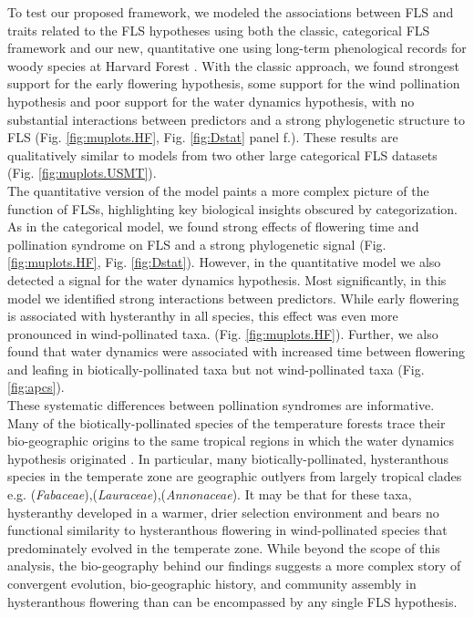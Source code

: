 \documentclass{article}
\begin{document}
To test our proposed framework, we modeled the associations between FLS and traits related to the FLS hypotheses using both the classic, categorical FLS framework and our new, quantitative one using long-term phenological records for woody species at Harvard Forest \citep{OKeefe2015}. With the classic approach, we found strongest support for the early flowering hypothesis, some support for the wind pollination hypothesis and poor support for the water dynamics hypothesis, with no substantial interactions between predictors and a strong phylogenetic structure to FLS (Fig. \ref{fig:muplots.HF}, Fig.  \ref{fig:Dstat} panel f.). These results are qualitatively similar to models from two other large categorical FLS datasets (Fig. \ref{fig:muplots.USMT}). \\

\noindent The quantitative version of the model paints a more complex picture of the function of FLSs, highlighting key biological insights obscured by categorization. As in the categorical model, we found strong effects of flowering time and pollination syndrome on FLS and a strong phylogenetic signal (Fig. \ref{fig:muplots.HF}, Fig. \ref{fig:Dstat}). However, in the quantitative model we also detected a signal for the water dynamics hypothesis. %
Most significantly, in this model we identified strong interactions between predictors. While early flowering is associated with hysteranthy in all species, this effect was even more pronounced in wind-pollinated taxa. (Fig. \ref{fig:muplots.HF}). Further, we also found that water dynamics were associated with increased time between flowering and leafing in biotically-pollinated taxa but not wind-pollinated taxa (Fig. \ref{fig:apcs}). \\ 

\noindent These systematic differences between pollination syndromes are informative. Many of the biotically-pollinated species of the temperature forests trace their bio-geographic origins to the same tropical regions \citep{Daubenmire1972} in which the water dynamics hypothesis originated \citep{Janzen1967,Franklin2016}. In particular, many biotically-pollinated, hysteranthous species in the temperate zone are geographic outlyers from largely tropical clades e.g. (\textit{Fabaceae}),(\textit{Lauraceae}),(\textit{Annonaceae}). It may be that for these taxa, hysteranthy developed in a warmer, drier selection environment and bears no functional similarity to hysteranthous flowering in wind-pollinated species that predominately evolved in the temperate zone. While beyond the scope of this analysis, the bio-geography behind our findings suggests a more complex story of convergent evolution, bio-geographic history, and community assembly in hysteranthous flowering than can be encompassed by any single FLS hypothesis.\\
\end{document}
